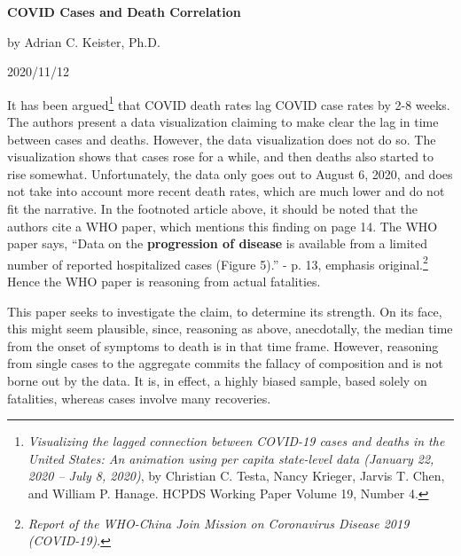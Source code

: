 \documentclass[12pt]{article}
\begin{document}
\begin{center}
{\bf COVID Cases and Death Correlation}

by Adrian C. Keister, Ph.D.

2020/11/12
\end{center}

It has been argued\footnote{{\it Visualizing the lagged connection between 
COVID-19 cases and deaths in the United States: An animation using per capita 
state-level data (January	22, 2020 – July 8, 2020)}, by Christian C. Testa, 
Nancy Krieger, Jarvis T. Chen, and William P. Hanage. HCPDS Working Paper 
Volume 19, Number 4.} that COVID death rates lag COVID case rates by 
2-8 weeks. The authors present a data visualization claiming to make
clear the lag in time between cases and deaths. However, the data visualization
does not do so. The visualization shows that cases rose for a while, and then
deaths also started to rise somewhat. Unfortunately, the data only goes out
to August 6, 2020, and does not take into account more recent death rates, which
are much lower and do not fit the narrative. 
In the footnoted article above, it should be noted that the authors
cite a WHO paper, which
mentions this finding on page 14. The WHO paper
says, ``Data on the {\bf progression of disease} is available from a limited
number of reported hospitalized cases (Figure 5).'' - p. 13, emphasis
original.\footnote{{\it Report of the
		WHO-China Join Mission on Coronavirus
		Disease 2019 (COVID-19)}.} Hence the WHO paper is reasoning from actual
	fatalities. 
	
This paper seeks to investigate the claim, to determine its strength. 
On its face, this might seem plausible, since, reasoning as above, anecdotally,
the median time from the onset of symptoms to death is in that time frame.
However, reasoning from single cases to the aggregate commits the fallacy of
composition and is not borne out by the data. It is, in effect,
a highly biased sample, based solely on fatalities, whereas cases involve
many recoveries. 
\end{document}
